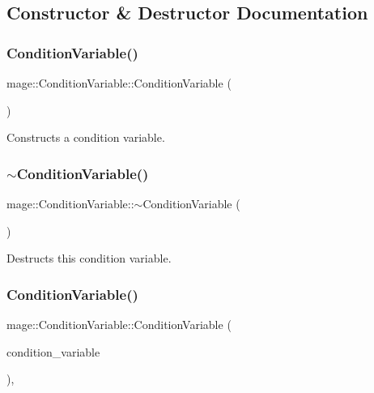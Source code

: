 \subsection{Constructor \& Destructor Documentation}
\hypertarget{classmage_1_1_condition_variable_a09073f0affc601f052fce541a17ba559}{}\label{classmage_1_1_condition_variable_a09073f0affc601f052fce541a17ba559} 
\subsubsection{\texorpdfstring{Condition\+Variable()}{ConditionVariable()}\hspace{0.1cm}{\footnotesize\ttfamily [1/3]}}
{\footnotesize\ttfamily mage\+::\+Condition\+Variable\+::\+Condition\+Variable (\begin{DoxyParamCaption}{ }\end{DoxyParamCaption})}

Constructs a condition variable. \hypertarget{classmage_1_1_condition_variable_accd5253beb65b2904428afdb889cf00b}{}\label{classmage_1_1_condition_variable_accd5253beb65b2904428afdb889cf00b} 
\subsubsection{\texorpdfstring{$\sim$\+Condition\+Variable()}{~ConditionVariable()}}
{\footnotesize\ttfamily mage\+::\+Condition\+Variable\+::$\sim$\+Condition\+Variable (\begin{DoxyParamCaption}{ }\end{DoxyParamCaption})}

Destructs this condition variable. \hypertarget{classmage_1_1_condition_variable_add5ccf5807a94588c28621141df334d3}{}\label{classmage_1_1_condition_variable_add5ccf5807a94588c28621141df334d3} 
\subsubsection{\texorpdfstring{Condition\+Variable()}{ConditionVariable()}\hspace{0.1cm}{\footnotesize\ttfamily [2/3]}}
{\footnotesize\ttfamily mage\+::\+Condition\+Variable\+::\+Condition\+Variable (\begin{DoxyParamCaption}\item[{const \hyperlink{classmage_1_1_condition_variable}{Condition\+Variable} \&}]{condition\+\_\+variable }\end{DoxyParamCaption})\hspace{0.3cm}{\ttfamily [private]}, {\ttfamily [delete]}}

